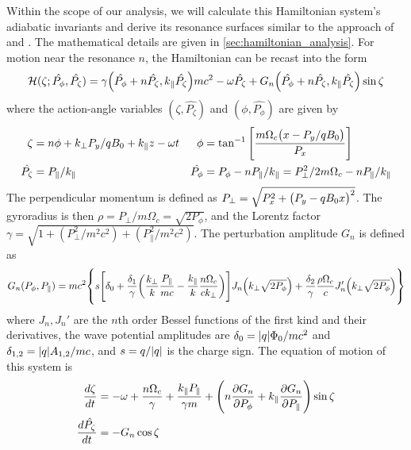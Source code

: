  Within the scope of our analysis, we will calculate this Hamiltonian system's
 adiabatic invariants and derive its resonance surfaces similar to
 the approach of \cite{Karimabadi1990} and \cite{RobergClark2019}.  The mathematical details are given in \cref{sec:hamiltonian_analysis}. For motion near the resonance $n$, the Hamiltonian can be recast into the form
 \begin{equation}\label{eq:1D_hamiltonian}
     \mathcal{H}(\zeta;\hat{P_\phi},\hat{P_\zeta})
     =\gamma\qty(\hat{P_\phi}+n\hat{P_\zeta},k_\|\hat{P_\zeta})mc^2
     -\omega\hat{P_\zeta}
     +G_n\qty(\hat{P_\phi}+n\hat{P_\zeta},k_\|\hat{P_\zeta})\sin\zeta
 \end{equation}
 where the action-angle variables $(\zeta,\hat{P_\zeta})$ and $(\phi,\hat{P_\phi})$ are
 given by
 \begin{align}
     \zeta&=n\phi+k_\bot P_y/qB_0+k_\| z-\omega t &
     \phi&=\tan^{-1}\qty[\frac{m\Omega_c\qty(x-P_y/qB_0)}{P_x}]\notag\\
     \hat{P_\zeta}&=P_\|/k_\| & \hat{P_\phi}&=P_\phi-nP_\|/k_\|=P_\perp^2/2m\Omega_c-nP_\|/k_\|
 \end{align}
 The perpendicular momentum is defined as
 $P_\perp=\sqrt{P_x^2+\qty(P_y-qB_0x)^2}$. The gyroradius is then
 $\rho=P_\perp/m\Omega_c=\sqrt{2P_\phi}$, and
 the Lorentz factor $\gamma=\sqrt{1+(P_\perp^2/m^2c^2)+(P_\|^2/m^2c^2)}$.
 The perturbation amplitude $G_n$ is defined as
 \begin{equation}
     G_n(P_\phi,P_\|)=mc^2\qty{s\qty[\delta_0+\frac{\delta_1}{\gamma}\qty(\frac{k_\perp}{k}\frac{P_\|}{mc}-\frac{k_\|}{k}\frac{n\Omega_c}{ck_\perp})]J_n\qty(k_\bot\sqrt{2P_\phi})+\frac{\delta_2}{\gamma}\frac{\rho\Omega_c}{c}J_n'\qty(k_\perp\sqrt{2P_\phi})}
 \end{equation}
 where $J_n,J_n'$ are the $n$th order Bessel functions of the first kind and
 their derivatives, the wave potential amplitudes are
 $\delta_0=\abs{q}\Phi_0/mc^2$ and $\delta_{1,2}=\abs{q}A_{1,2}/mc$, and
 $s=q/\abs{q}$ is the charge sign. The equation of motion of this system is
 \begin{subequations}\label{eq:hamiltonian_eom}
    \begin{align}
        \frac{d\zeta}{dt}&=-\omega+\frac{n\Omega_c}{\gamma}+\frac{k_\|P_\|}{\gamma m}+\qty(n\frac{\partial
        G_n}{\partial P_\phi}+k_\|\frac{\partial G_n}{\partial
    P_\|})\sin\zeta\label{eq:dzdt}\\
            \frac{d\hat{P_\zeta}}{dt}&=-G_n\cos\zeta\label{eq:dPdt}
    \end{align}
 \end{subequations}

